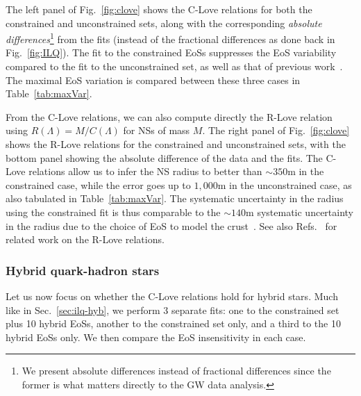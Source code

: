 \documentclass[prd,twocolumn,nofootinbib,superscriptaddress,amsmath,amssymb]{revtex4-1}
\begin{document}
The left panel of Fig.~\ref{fig:clove} shows the C-Love relations for both the constrained and unconstrained sets, along with the corresponding \emph{absolute differences}\footnote{We present absolute differences instead of fractional differences since the former is what matters directly to the GW data analysis.} from the fits (instead of the fractional differences as done back in Fig.~\ref{fig:ILQ}). The fit to the constrained EoSs suppresses the EoS variability compared to the fit to the unconstrained set, as well as that of previous work~\cite{Maselli:2013mva}. The maximal EoS variation is compared between these three cases in Table~\ref{tab:maxVar}.

From the C-Love relations, we can also compute directly the R-Love relation using $R(\Lambda)=M/C(\Lambda)$ for NSs of mass $M$. The right panel of Fig.~\ref{fig:clove} shows the R-Love relations for the constrained and unconstrained sets, with the bottom panel showing the absolute difference of the data and the fits. The C-Love relations allow us to infer the NS radius to better than $\sim 350 \textrm{m} $ in the constrained case, while the error goes up to $1,000 \textrm{m}$ in the unconstrained case, as also tabulated in Table~\ref{tab:maxVar}. The systematic uncertainty in the radius using the constrained fit is thus comparable to the $\sim 140\textrm{m}$ systematic uncertainty in the radius due to the choice of EoS to model the crust~\cite{Gamba:2019kwu}. 
See also Refs.~\cite{Annala:2017llu,Raithel:2018ncd} for related work on the R-Love relations.

\subsubsection{Hybrid quark-hadron stars}
\label{sec:clove-hyb}

Let us now focus on whether the C-Love relations hold for hybrid stars. Much like in Sec.~\ref{sec:ilq-hyb}, we perform 3 separate fits: one to the constrained set plus 10 hybrid EoSs, another to the constrained set only, and a third to the 10 hybrid EoSs only. We then compare the EoS insensitivity in each case.
\end{document}

